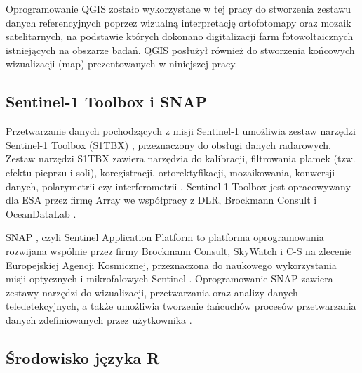 \documentclass{amuthesis}
\begin{document}
Oprogramowanie QGIS zostało wykorzystane w tej pracy do stworzenia
zestawu danych referencyjnych poprzez wizualną interpretację
ortofotomapy oraz mozaik satelitarnych, na podstawie których dokonano
digitalizacji farm fotowoltaicznych istniejących na obszarze badań. QGIS
posłużył również do stworzenia końcowych wizualizacji (map)
prezentowanych w niniejszej pracy.

\hypertarget{sentinel-1-toolbox-i-snap}{%
\subsection{Sentinel-1 Toolbox i SNAP}\label{sentinel-1-toolbox-i-snap}}

Przetwarzanie danych pochodzących z misji Sentinel-1 umożliwia zestaw
narzędzi Sentinel-1 Toolbox (S1TBX) \autocite{s1tbx}, przeznaczony do
obsługi danych radarowych. Zestaw narzędzi S1TBX zawiera narzędzia do
kalibracji, filtrowania plamek (tzw. efektu pieprzu i soli),
koregistracji, ortorektyfikacji, mozaikowania, konwersji danych,
polarymetrii czy interferometrii \autocite{sentinel-1-toolbox}.
Sentinel-1 Toolbox jest opracowywany dla ESA przez firmę Array we
współpracy z DLR, Brockmann Consult i OceanDataLab
\autocite{sentinel-1-toolbox}.

SNAP \autocite{snap}, czyli Sentinel Application Platform to platforma
oprogramowania rozwijana wspólnie przez firmy Brockmann Consult,
SkyWatch i C-S na zlecenie Europejskiej Agencji Kosmicznej, przeznaczona
do naukowego wykorzystania misji optycznych i mikrofalowych Sentinel
\autocite{snap-desktop,esa_snap}. Oprogramowanie SNAP zawiera zestawy
narzędzi do wizualizacji, przetwarzania oraz analizy danych
teledetekcyjnych, a także umożliwia tworzenie łańcuchów procesów
przetwarzania danych zdefiniowanych przez użytkownika
\autocite{hejmanowska_2020_dane,moskolai_2022_s1_workflow}.

\hypertarget{ux15brodowisko-jux119zyka-r}{%
\subsection{Środowisko języka R}\label{ux15brodowisko-jux119zyka-r}}
\end{document}
